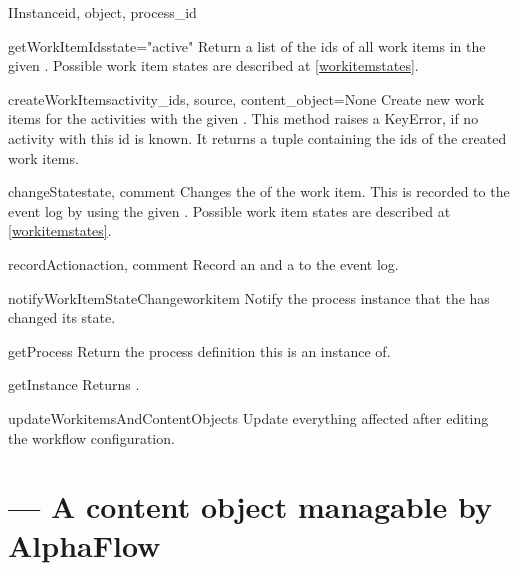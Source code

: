 \begin{classdesc}{IInstance}{id, object, process_id}
      \begin{funcdesc}{getWorkItemIds}{state="active"}
        Return a list of the ids of all work items in the given .
        Possible work item states are described at \ref{workitemstates}.
      \end{funcdesc}

      \begin{funcdesc}{createWorkItems}{activity_ids, source, content_object=None}
        Create new work items for the activities with the given 
        . This method raises a KeyError, if no 
        activity with this id is known. It returns a tuple containing 
        the ids of the created work items.
      \end{funcdesc}

      \begin{funcdesc}{changeState}{state, comment}
        Changes the  of the work item. This is recorded to the event
        log by using the given .
        Possible work item states are described at \ref{workitemstates}.
      \end{funcdesc}

      \begin{funcdesc}{recordAction}{action, comment}
        Record an  and a  to the event log.
      \end{funcdesc}

      \begin{funcdesc}{notifyWorkItemStateChange}{workitem}
        Notify the process instance that the  has changed 
        its state.
      \end{funcdesc}

      \begin{funcdesc}{getProcess}{}
        Return the process definition this is an instance of.
      \end{funcdesc}

      \begin{funcdesc}{getInstance}{}
        Returns .
      \end{funcdesc}

      \begin{funcdesc}{updateWorkitemsAndContentObjects}{}
        Update everything affected after editing the workflow configuration.
      \end{funcdesc}

    \end{classdesc}

  \section{ --- A content object managable by AlphaFlow}

